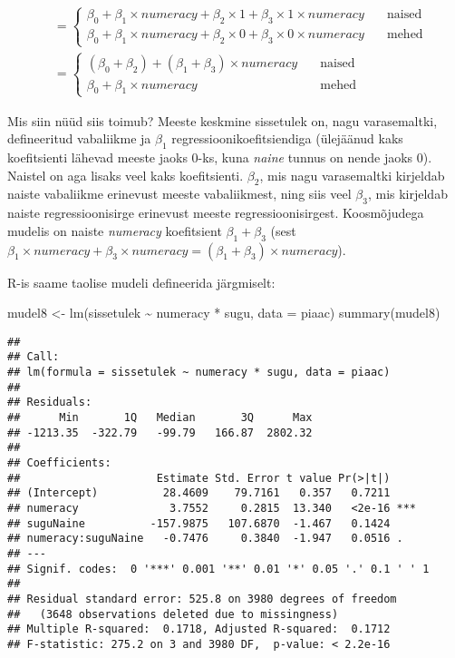 \documentclass[
]{book}
\newenvironment{Shaded}{\begin{snugshade}}{\end{snugshade}}
\newcommand{\AttributeTok}[1]{\textcolor[rgb]{0.77,0.63,0.00}{#1}}
\newcommand{\FunctionTok}[1]{\textcolor[rgb]{0.00,0.00,0.00}{#1}}
\newcommand{\NormalTok}[1]{#1}
\newcommand{\OtherTok}[1]{\textcolor[rgb]{0.56,0.35,0.01}{#1}}
\newcommand{\SpecialCharTok}[1]{\textcolor[rgb]{0.00,0.00,0.00}{#1}}
\begin{document}
\begin{align}
&=
  \begin{cases}
    \beta_0+\beta_1 \times numeracy + \beta_2 \times 1 + \beta_3 \times 1 \times numeracy  & \quad \text{naised}\\
    \beta_0+\beta_1 \times numeracy + \beta_2 \times 0 + \beta_3 \times 0 \times numeracy & \quad \text{mehed}
  \end{cases}\\
&=
  \begin{cases}
    (\beta_0+\beta_2)+(\beta_1+\beta_3) \times numeracy  & \quad \text{naised}\\
    \beta_0+\beta_1 \times numeracy & \quad \text{mehed}
  \end{cases}
\end{align}

Mis siin nüüd siis toimub? Meeste keskmine sissetulek on, nagu varasemaltki, defineeritud vabaliikme ja \(\beta_1\) regressioonikoefitsiendiga (ülejäänud kaks koefitsienti lähevad meeste jaoks \(0\)-ks, kuna \emph{naine} tunnus on nende jaoks \(0\)). Naistel on aga lisaks veel kaks koefitsienti. \(\beta_2\), mis nagu varasemaltki kirjeldab naiste vabaliikme erinevust meeste vabaliikmest, ning siis veel \(\beta_3\), mis kirjeldab naiste regressioonisirge erinevust meeste regressioonisirgest. Koosmõjudega mudelis on naiste \emph{numeracy} koefitsient \(\beta_1+\beta_3\) (sest \(\beta_1 \times numeracy + \beta_3 \times numeracy = (\beta_1+\beta_3) \times numeracy\)).

R-is saame taolise mudeli defineerida järgmiselt:

\begin{Shaded}
\begin{Highlighting}[]
\NormalTok{mudel8 }\OtherTok{\textless{}{-}} \FunctionTok{lm}\NormalTok{(sissetulek }\SpecialCharTok{\textasciitilde{}}\NormalTok{ numeracy }\SpecialCharTok{*}\NormalTok{ sugu, }\AttributeTok{data =}\NormalTok{ piaac)}
\FunctionTok{summary}\NormalTok{(mudel8)}
\end{Highlighting}
\end{Shaded}

\begin{verbatim}
## 
## Call:
## lm(formula = sissetulek ~ numeracy * sugu, data = piaac)
## 
## Residuals:
##      Min       1Q   Median       3Q      Max 
## -1213.35  -322.79   -99.79   166.87  2802.32 
## 
## Coefficients:
##                     Estimate Std. Error t value Pr(>|t|)    
## (Intercept)          28.4609    79.7161   0.357   0.7211    
## numeracy              3.7552     0.2815  13.340   <2e-16 ***
## suguNaine          -157.9875   107.6870  -1.467   0.1424    
## numeracy:suguNaine   -0.7476     0.3840  -1.947   0.0516 .  
## ---
## Signif. codes:  0 '***' 0.001 '**' 0.01 '*' 0.05 '.' 0.1 ' ' 1
## 
## Residual standard error: 525.8 on 3980 degrees of freedom
##   (3648 observations deleted due to missingness)
## Multiple R-squared:  0.1718, Adjusted R-squared:  0.1712 
## F-statistic: 275.2 on 3 and 3980 DF,  p-value: < 2.2e-16
\end{verbatim}
\end{document}
